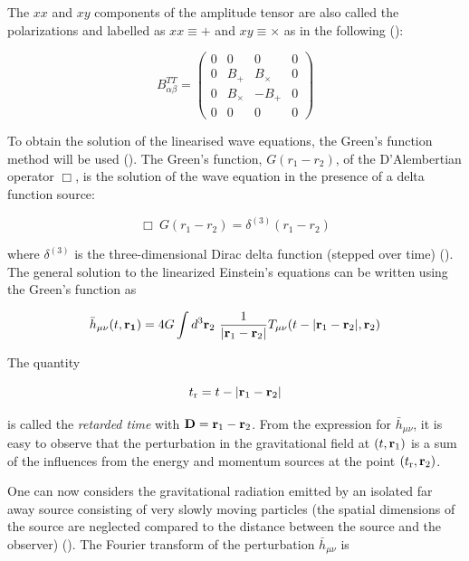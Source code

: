 \documentclass[epsf]{article}
\begin{document}
The $xx$ and $xy$ components of the amplitude tensor are also called the polarizations and labelled as $xx \equiv +$ and $xy \equiv \times$ as in the following (\cite{schutz,maggiore,chaky,ian}):

\begin{equation}
\boxed{B^{TT}_{\alpha\beta} = \left( \begin{array}{cccc}
              0 & 0 & 0 & 0 \\
              0 & B_+ & B_{\times} & 0 \\
              0 & B_{\times} & -B_{+} & 0 \\
              0 & 0 & 0 & 0 \end{array} \right)}
\label{eqn:polarizations}
\end{equation}
 
To obtain the solution of the linearised wave equations, the Green's function method will be used (\cite{schutz,maggiore,chaky}).
The Green's function, $G(r_1 - r_2)$, of the D'Alembertian 
operator $\Box$, is the solution of the wave equation in the presence of 
a delta function source:

\begin{equation}
\Box~G(r_1 - r_2) = \delta^{(3)}(r_1 - r_2)
\end{equation}

where $\delta^{(3)}$ is the three-dimensional Dirac delta function (stepped over time) (\cite{schutz,maggiore,chaky}). The 
general solution to the linearized Einstein's equations can be 
written using the Green's function as


\begin{equation}
\bar{h}_{\mu\nu}(t, {\bf r_1}) = 4G\int d^3 {\bf r}_2~\frac{1}{|{\bf r}_1 - {\bf r}_2|}
T_{\mu\nu}(t - |{\bf r}_1 - {\bf r}_2|, {\bf r}_2) 
\end{equation}

The quantity

\begin{equation}
t_{\rm r} = t - |{\bf r}_1 - {\bf r}_2|
\end{equation}

is called the {\it retarded time} with ${\bf D}= {\bf r}_1- {\bf r}_2$. From the expression for $\bar{h}_
{\mu\nu}$, it is easy to observe that the perturbation in the gravitational field at 
$(t, {\bf r}_1)$ is a sum of the influences from the energy and momentum 
sources at the point $(t_{\rm r}, {\bf r}_2)$.

One can now considers the gravitational radiation
emitted by an isolated far away source consisting of very slowly moving 
particles (the spatial dimensions of the source are neglected compared 
to the distance between the source and the observer) (\cite{maggiore,chaky}). The Fourier 
transform of the perturbation $\bar{h}_{\mu\nu}$ is 
\end{document}
